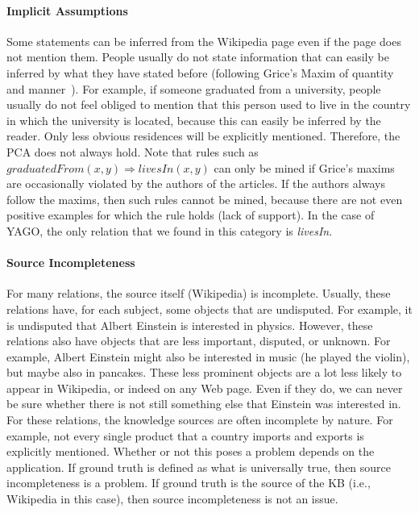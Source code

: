 \paragraph{Implicit Assumptions} Some statements can be inferred from the Wikipedia page even if the page does not mention them. %
People usually do not state information that can easily be inferred by what they have stated before
(following Grice's Maxim of quantity and manner~\cite{grice}). %
For example, if someone graduated from a university, people usually do not feel obliged to mention that this person used to live in the country
 in which the university is located,
because this can easily be inferred by the reader. Only less obvious residences will be explicitly mentioned. Therefore, the PCA does not always hold.
Note that rules such as $graduatedFrom(x,y)\Rightarrow livesIn(x,y)$ can only be mined if Grice's maxims are occasionally violated by the authors of the articles.
If the authors always follow the maxims, then such rules cannot be mined, because there are not even positive examples for which the rule holds (lack of support).
In the case of YAGO, the only relation that we found in this category is \emph{livesIn}.


\paragraph{Source Incompleteness} For many relations, the source itself (Wikipedia) is incomplete.
Usually, these relations have, for each subject, some objects that are undisputed.
For example, it is undisputed that Albert Einstein is interested in physics. However, these relations also have objects that are less important, disputed, or unknown.
For example, Albert Einstein might also be interested in music (he played the violin), but maybe also in pancakes.
These less prominent objects are a lot less likely to appear in Wikipedia, or indeed on any Web page.
Even if they do, we can never be sure whether there is not still something else that Einstein was interested in.
For these relations, the knowledge sources are often incomplete by nature.
For example, not every single product that a country imports and exports is explicitly mentioned.
Whether or not this poses a problem depends on the application.
If ground truth is defined as what is universally true, then source incompleteness is a problem.
If ground truth is the source of the KB (i.e., Wikipedia in this case), then source incompleteness is not an issue.




